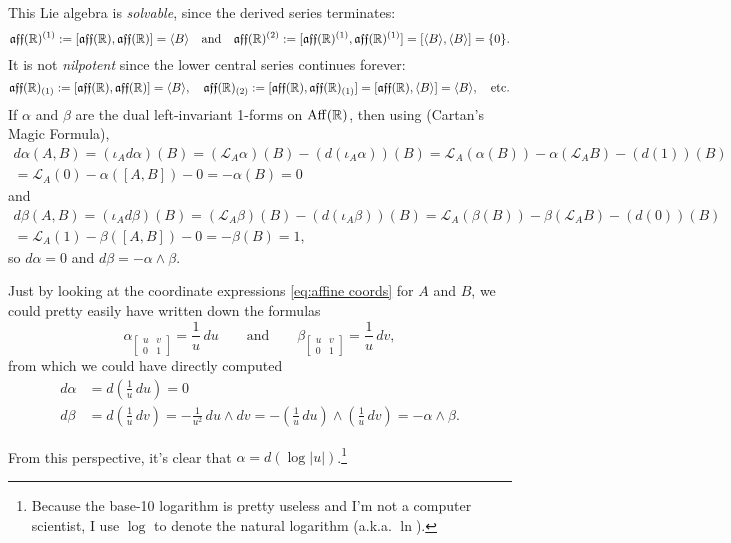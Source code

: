 \begin{example}
	This Lie algebra is \emph{solvable}, since the derived series terminates:
	\[
		\mathfrak{aff}(\mathbb{R})^{(1)} := [\mathfrak{aff}(\mathbb{R}),\mathfrak{aff}(\mathbb{R})] = \langle B \rangle \quad \text{and}\quad \mathfrak{aff}(\mathbb{R})^{(2)} := [\mathfrak{aff}(\mathbb{R})^{(1)},\mathfrak{aff}(\mathbb{R})^{(1)}] = [\langle B \rangle, \langle B \rangle] = \{0\}.
	\]
	It is not \emph{nilpotent} since the lower central series continues forever:
	\[
		\mathfrak{aff}(\mathbb{R})_{(1)} := [\mathfrak{aff}(\mathbb{R}),\mathfrak{aff}(\mathbb{R})] = \langle B \rangle, \quad  \mathfrak{aff}(\mathbb{R})_{(2)} := [\mathfrak{aff}(\mathbb{R}),\mathfrak{aff}(\mathbb{R})_{(1)}] = [\mathfrak{aff}(\mathbb{R}), \langle B \rangle] = \langle B \rangle, \quad \text{etc.}
	\]
	If $\alpha$ and $\beta$ are the dual left-invariant 1-forms on $\operatorname{Aff}(\mathbb{R})$, then using  (Cartan's Magic Formula),
	\begin{multline*}
		d\alpha(A,B) = (\iota_A d\alpha)(B) = (\mathcal{L}_A \alpha)(B) - (d(\iota_A\alpha))(B) = \mathcal{L}_A(\alpha(B)) - \alpha(\mathcal{L}_AB) - (d(1))(B) \\
		= \mathcal{L}_A(0) - \alpha([A,B]) - 0 = -\alpha(B) = 0
	\end{multline*}
	and
	\begin{multline*}
		d\beta(A,B) = (\iota_A d\beta)(B) = (\mathcal{L}_A \beta)(B) - (d(\iota_A\beta))(B) = \mathcal{L}_A(\beta(B)) - \beta(\mathcal{L}_AB) - (d(0))(B) \\
		= \mathcal{L}_A(1) - \beta([A,B]) - 0 = -\beta(B) = 1,
	\end{multline*}
	so $d\alpha = 0$ and $d\beta = -\alpha \wedge \beta$.
	
	Just by looking at the coordinate expressions \eqref{eq:affine coords} for $A$ and $B$, we could pretty easily have written down the formulas
	\[
		\alpha_{\begin{bmatrix} u & v \\ 0 & 1 \end{bmatrix}} = \frac{1}{u} \, du \qquad \text{and} \qquad \beta_{\begin{bmatrix} u & v \\ 0 & 1 \end{bmatrix}} = \frac{1}{u} \, dv, 
	\]
	from which we could have directly computed
	\begin{align*}
		d\alpha & = d\left(\frac{1}{u} \, du\right) = 0 \\
		d\beta & = d\left(\frac{1}{u} \, dv\right) = -\frac{1}{u^2} \, du \wedge dv = -\left(\frac{1}{u} \, du \right) \wedge \left(\frac{1}{u} \, dv \right) = -\alpha \wedge \beta.
	\end{align*}
	
	From this perspective, it's clear that $\alpha = d(\log |u|)$.\footnote{Because the base-10 logarithm is pretty useless and I'm not a computer scientist, I use $\log$ to denote the natural logarithm (a.k.a. $\ln$).}
\end{example}

